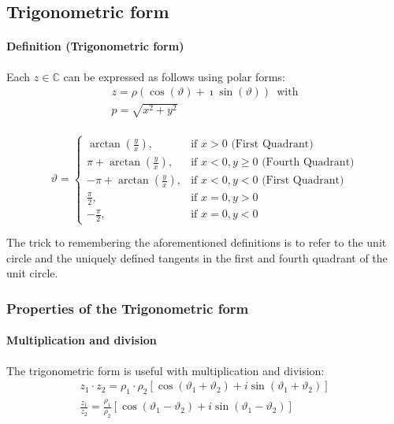 \documentclass[a4paper]{report}
\begin{document}
\subsection{\textbf{Trigonometric form}}
\paragraph{\textbf{Definition (Trigonometric form)}}
Each $z\in\mathbb{C}$ can be expressed as follows using polar forms:
\begin{align}
z = \rho(\cos(\vartheta) + \imath\sin(\vartheta)) \enspace \text{with} \\
p =  \sqrt{x^{2} + y^{2}}\\
\end{align}


\[
\vartheta = 
\begin{cases}
\arctan(\frac{y}{x}), & \text{if } x>0 \text{ (First Quadrant)}\\
\pi + \arctan(\frac{y}{x}), & \text{if } x<0, y \geq 0 \text{ (Fourth Quadrant)}\\
-\pi + \arctan(\frac{y}{x}), & \text{if } x<0, y<0 \text{ (First Quadrant)}\\
\frac{\pi}{2}, & \text{if } x=0, y>0\\
-\frac{\pi}{2}, & \text{if } x=0, y<0
\end{cases}
\]


The trick to remembering the aforementioned definitions is to refer to the unit circle and the uniquely defined tangents in the first and fourth quadrant of the unit circle.

\subsubsection{\textbf{Properties of the Trigonometric form}}
\paragraph{\textbf{Multiplication and division}}
The trigonometric form is useful with multiplication and division:
\begin{align}
z_{1}\cdot z_{2} = \rho_{1} \cdot \rho_{2} \left [ \cos\left ( \vartheta_{1} +  \vartheta_{2} \right ) + i\sin\left ( \vartheta_{1} +  \vartheta_{2} \right ) \right ]\\
\frac{z_{1}}{z_{2}} = \frac{\rho_{1}}{\rho_{2}} \left [ \cos\left ( \vartheta_{1} -  \vartheta_{2} \right ) + i\sin\left ( \vartheta_{1} -  \vartheta_{2} \right ) \right ]
\end{align}
\end{document}
